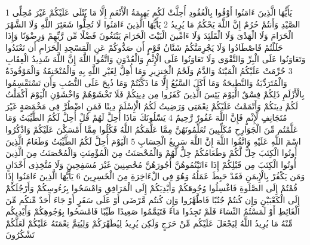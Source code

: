 {\tiny\colorbox{cl_aya}{1}} يَأَيُّهَا الَّذِينَ ءَامَنُوا أَوْفُوا بِالْعُقُودِ أُحِلَّتْ لَكُم بَهِيمَةُ الْأَنْعَمِ إِلَّا مَا يُتْلَى عَلَيْكُمْ غَيْرَ مُحِلِّى الصَّيْدِ وَأَنتُمْ حُرُمٌ إِنَّ اللَّهَ يَحْكُمُ مَا يُرِيدُ
{\tiny\colorbox{cl_aya}{2}} يَأَيُّهَا الَّذِينَ ءَامَنُوا لَا تُحِلُّوا شَعَئِرَ اللَّهِ وَلَا الشَّهْرَ الْحَرَامَ وَلَا الْهَدْىَ وَلَا الْقَلَئِدَ وَلَا ءَامِّينَ الْبَيْتَ الْحَرَامَ يَبْتَغُونَ فَضْلًا مِّن رَّبِّهِمْ وَرِضْوَنًا وَإِذَا حَلَلْتُمْ فَاصْطَادُوا وَلَا يَجْرِمَنَّكُمْ شَنََٔانُ قَوْمٍ أَن صَدُّوكُمْ عَنِ الْمَسْجِدِ الْحَرَامِ أَن تَعْتَدُوا وَتَعَاوَنُوا عَلَى الْبِرِّ وَالتَّقْوَى وَلَا تَعَاوَنُوا عَلَى الْإِثْمِ وَالْعُدْوَنِ وَاتَّقُوا اللَّهَ إِنَّ اللَّهَ شَدِيدُ الْعِقَابِ
{\tiny\colorbox{cl_aya}{3}} حُرِّمَتْ عَلَيْكُمُ الْمَيْتَةُ وَالدَّمُ وَلَحْمُ الْخِنزِيرِ وَمَا أُهِلَّ لِغَيْرِ اللَّهِ بِهِ وَالْمُنْخَنِقَةُ وَالْمَوْقُوذَةُ وَالْمُتَرَدِّيَةُ وَالنَّطِيحَةُ وَمَا أَكَلَ السَّبُعُ إِلَّا مَا ذَكَّيْتُمْ وَمَا ذُبِحَ عَلَى النُّصُبِ وَأَن تَسْتَقْسِمُوا بِالْأَزْلَمِ ذَلِكُمْ فِسْقٌ الْيَوْمَ يَئِسَ الَّذِينَ كَفَرُوا مِن دِينِكُمْ فَلَا تَخْشَوْهُمْ وَاخْشَوْنِ الْيَوْمَ أَكْمَلْتُ لَكُمْ دِينَكُمْ وَأَتْمَمْتُ عَلَيْكُمْ نِعْمَتِى وَرَضِيتُ لَكُمُ الْإِسْلَمَ دِينًا فَمَنِ اضْطُرَّ فِى مَخْمَصَةٍ غَيْرَ مُتَجَانِفٍ لِّإِثْمٍ فَإِنَّ اللَّهَ غَفُورٌ رَّحِيمٌ
{\tiny\colorbox{cl_aya}{4}} يَسَْٔلُونَكَ مَاذَا أُحِلَّ لَهُمْ قُلْ أُحِلَّ لَكُمُ الطَّيِّبَتُ وَمَا عَلَّمْتُم مِّنَ الْجَوَارِحِ مُكَلِّبِينَ تُعَلِّمُونَهُنَّ مِمَّا عَلَّمَكُمُ اللَّهُ فَكُلُوا مِمَّا أَمْسَكْنَ عَلَيْكُمْ وَاذْكُرُوا اسْمَ اللَّهِ عَلَيْهِ وَاتَّقُوا اللَّهَ إِنَّ اللَّهَ سَرِيعُ الْحِسَابِ
{\tiny\colorbox{cl_aya}{5}} الْيَوْمَ أُحِلَّ لَكُمُ الطَّيِّبَتُ وَطَعَامُ الَّذِينَ أُوتُوا الْكِتَبَ حِلٌّ لَّكُمْ وَطَعَامُكُمْ حِلٌّ لَّهُمْ وَالْمُحْصَنَتُ مِنَ الْمُؤْمِنَتِ وَالْمُحْصَنَتُ مِنَ الَّذِينَ أُوتُوا الْكِتَبَ مِن قَبْلِكُمْ إِذَا ءَاتَيْتُمُوهُنَّ أُجُورَهُنَّ مُحْصِنِينَ غَيْرَ مُسَفِحِينَ وَلَا مُتَّخِذِى أَخْدَانٍ وَمَن يَكْفُرْ بِالْإِيمَنِ فَقَدْ حَبِطَ عَمَلُهُ وَهُوَ فِى الْءَاخِرَةِ مِنَ الْخَسِرِينَ
{\tiny\colorbox{cl_aya}{6}} يَأَيُّهَا الَّذِينَ ءَامَنُوا إِذَا قُمْتُمْ إِلَى الصَّلَوةِ فَاغْسِلُوا وُجُوهَكُمْ وَأَيْدِيَكُمْ إِلَى الْمَرَافِقِ وَامْسَحُوا بِرُءُوسِكُمْ وَأَرْجُلَكُمْ إِلَى الْكَعْبَيْنِ وَإِن كُنتُمْ جُنُبًا فَاطَّهَّرُوا وَإِن كُنتُم مَّرْضَى أَوْ عَلَى سَفَرٍ أَوْ جَاءَ أَحَدٌ مِّنكُم مِّنَ الْغَائِطِ أَوْ لَمَسْتُمُ النِّسَاءَ فَلَمْ تَجِدُوا مَاءً فَتَيَمَّمُوا صَعِيدًا طَيِّبًا فَامْسَحُوا بِوُجُوهِكُمْ وَأَيْدِيكُم مِّنْهُ مَا يُرِيدُ اللَّهُ لِيَجْعَلَ عَلَيْكُم مِّنْ حَرَجٍ وَلَكِن يُرِيدُ لِيُطَهِّرَكُمْ وَلِيُتِمَّ نِعْمَتَهُ عَلَيْكُمْ لَعَلَّكُمْ تَشْكُرُونَ
